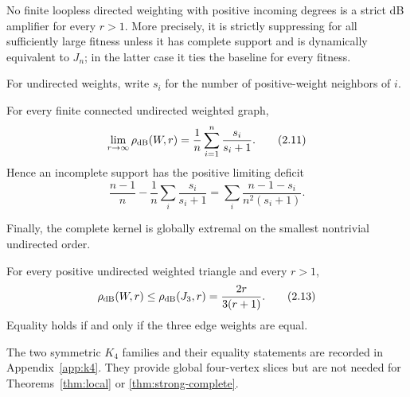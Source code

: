\begin{corollary}
\label{cor:fixed}
No finite loopless directed weighting with positive incoming degrees is a
strict dB amplifier for every $r>1$.  More precisely, it is strictly
suppressing for all sufficiently large fitness unless it has complete
support and is dynamically equivalent to $J_n$; in the latter case it ties
the baseline for every fitness.
\end{corollary}

For undirected weights, write $s_i$ for the number of positive-weight
neighbors of $i$.

\begin{proposition}\label{prop:support-limit}
For every finite connected undirected weighted graph,
\[
 \lim_{r\to\infty}\rho_{\mathrm{dB}}(W,r)
 =\frac1n\sum_{i=1}^n\frac{s_i}{s_i+1}.                     \tag{2.11}\label{2.11}
\]
Hence an incomplete support has the positive limiting deficit
\[
 \frac{n-1}{n}-\frac1n\sum_i\frac{s_i}{s_i+1}
 =\sum_i\frac{n-1-s_i}{n^2(s_i+1)}.                         \tag{2.12}\label{2.12}
\]
\end{proposition}

Finally, the complete kernel is globally extremal on the smallest
nontrivial undirected order.

\begin{theorem}\label{thm:triangle}
For every positive undirected weighted triangle and every $r>1$,
\[
 \rho_{\mathrm{dB}}(W,r)\le\rho_{\mathrm{dB}}(J_3,r)=\frac{2r}{3(r+1)}.     \tag{2.13}\label{2.13}
\]
Equality holds if and only if the three edge weights are equal.
\end{theorem}

The two symmetric $K_4$ families and their equality statements are recorded
in Appendix~\ref{app:k4}.  They provide global four-vertex slices but are not
needed for Theorems~\ref{thm:local} or \ref{thm:strong-complete}.
